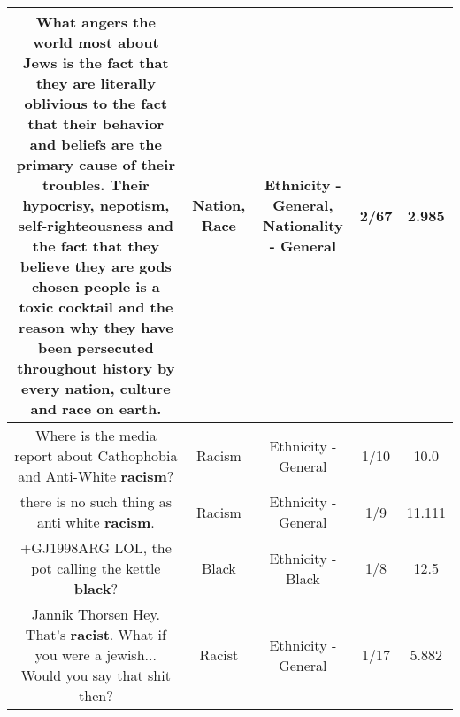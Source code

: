 \documentclass[11pt]{article}
\newlength\mylength
\begin{document}
\begin{center}
\begin{longtable}{|C{.65\mylength}|C{.30\mylength}|C{.12\mylength}|C{.12\mylength}|C{.12\mylength}|}
  \small What angers the world most about Jews is the fact that they are literally oblivious to the fact that their behavior and beliefs are the primary cause of their troubles. Their hypocrisy, nepotism, self-righteousness and the fact that they believe they are gods chosen people is a toxic cocktail and the reason why they have been persecuted throughout history by every \textbf{nation}, culture and \textbf{race} on earth.\normalsize   & Nation, Race & Ethnicity - General, Nationality - General & 2/67 & 2.985 \\  \hline
  \small Where is the media report about Cathophobia and Anti-White \textbf{racism}?\normalsize   & Racism & Ethnicity - General & 1/10 & 10.0 \\  \hline
  \small there is no such thing as anti white \textbf{racism}.\normalsize   & Racism & Ethnicity - General & 1/9 & 11.111 \\  \hline
  \small +GJ1998ARG LOL, the pot calling the kettle \textbf{black}?\normalsize   & Black & Ethnicity - Black & 1/8 & 12.5 \\  \hline
  \small Jannik Thorsen Hey. That's \textbf{racist}. What if you were a jewish... Would you say that shit then?\normalsize   & Racist & Ethnicity - General & 1/17 & 5.882 \\  \hline

\end{longtable}
\end{center}
\end{document}
